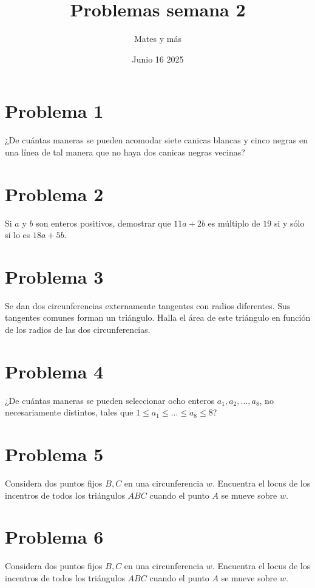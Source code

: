 \documentclass{article}
\title{Problemas semana 2}
\author{Mates y más}
\date{Junio 16 2025}
\begin{document}
\maketitle

\section{Problema 1}
¿De cuántas maneras se pueden acomodar siete canicas blancas y cinco negras en una línea de tal manera que no haya dos canicas negras vecinas?

\section{Problema 2}

    Si $a$ y $b$ son enteros positivos, demostrar que $11a+2b$ es múltiplo de $19$ si y sólo si lo es $18a+5b$.

\section{Problema 3}

    Se dan dos circunferencias externamente tangentes con radios diferentes. Sus tangentes comunes forman un triángulo. Halla el área de este triángulo en función de los radios de las dos circunferencias.

\section{Problema 4}

    ¿De cuántas maneras se pueden seleccionar ocho enteros $a_1,a_2, ... ,a_8$, no necesariamente distintos, tales que $1 \le a_1 \le ... \le a_8 \le 8$?

\section{Problema 5}

    Considera dos puntos fijos $B,C$ en una circunferencia $w$. Encuentra el locus de los incentros de todos los triángulos $ABC$ cuando el punto $A$ se mueve sobre $w$.

\section{Problema 6}

    Considera dos puntos fijos $B,C$ en una circunferencia $w$. Encuentra el locus de los incentros de todos los triángulos $ABC$ cuando el punto $A$ se mueve sobre $w$.
\end{document}
